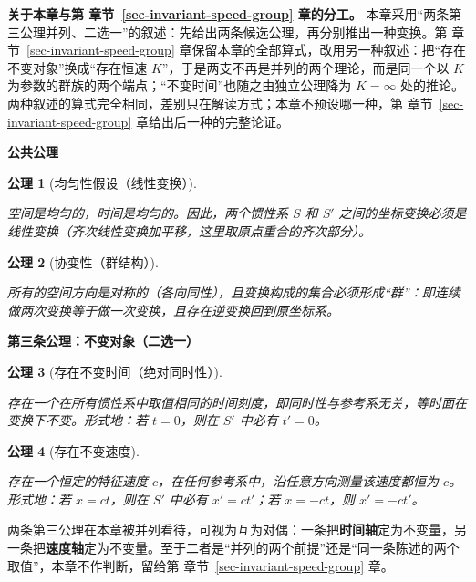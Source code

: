 \documentclass[
  chinese,
  a4paper,
  UTF8,
  12pt,
  oneside,
  openany]{ctexbook}
\theoremstyle{plain}
\theoremstyle{plain}
\newtheorem{conjecture}{公理}[chapter]
\theoremstyle{plain}
\theoremstyle{definition}
\theoremstyle{plain}
\theoremstyle{plain}
\theoremstyle{remark}
\begin{document}
\textbf{关于本章与第 章节~\ref{sec-invariant-speed-group} 章的分工。}
本章采用``两条第三公理并列、二选一''的叙述：先给出两条候选公理，再分别推出一种变换。第
章节~\ref{sec-invariant-speed-group}
章保留本章的全部算式，改用另一种叙述：把``存在不变对象''换成``存在恒速
\(K\)''，于是两支不再是并列的两个理论，而是同一个以 \(K\)
为参数的群族的两个端点；``不变时间''也随之由独立公理降为 \(K=\infty\)
处的推论。两种叙述的算式完全相同，差别只在解读方式；本章不预设哪一种，第
章节~\ref{sec-invariant-speed-group} 章给出后一种的完整论证。

\textbf{公共公理}

\begin{conjecture}[均匀性假设（线性变换）]\protect\hypertarget{cnj-homogeneity}{}\label{cnj-homogeneity}

空间是均匀的，时间是均匀的。因此，两个惯性系 \(S\) 和 \(S'\)
之间的坐标变换必须是线性变换（齐次线性变换加平移，这里取原点重合的齐次部分）。

\end{conjecture}

\begin{conjecture}[协变性（群结构）]\protect\hypertarget{cnj-covariance}{}\label{cnj-covariance}

所有的空间方向是对称的（各向同性），且变换构成的集合必须形成``群''：即连续做两次变换等于做一次变换，且存在逆变换回到原坐标系。

\end{conjecture}

\textbf{第三条公理：不变对象（二选一）}

\begin{conjecture}[存在不变时间（绝对同时性）]\protect\hypertarget{cnj-invariant-time}{}\label{cnj-invariant-time}

存在一个在所有惯性系中取值相同的时间刻度，即同时性与参考系无关，等时面在变换下不变。形式地：若
\(t = 0\)，则在 \(S'\) 中必有 \(t' = 0\)。

\end{conjecture}

\begin{conjecture}[存在不变速度]\protect\hypertarget{cnj-invariant-speed}{}\label{cnj-invariant-speed}

存在一个恒定的特征速度 \(c\)，在任何参考系中，沿任意方向测量该速度都恒为
\(c\)。形式地：若 \(x = ct\)，则在 \(S'\) 中必有 \(x' = ct'\)；若
\(x = -ct\)，则 \(x' = -ct'\)。

\end{conjecture}

两条第三公理在本章被并列看待，可视为互为对偶：一条把\textbf{时间轴}定为不变量，另一条把\textbf{速度轴}定为不变量。至于二者是``并列的两个前提''还是``同一条陈述的两个取值''，本章不作判断，留给第
章节~\ref{sec-invariant-speed-group} 章。
\end{document}
